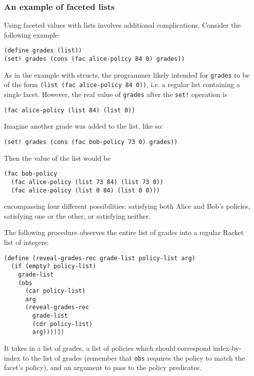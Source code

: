 \documentclass{article}
\begin{document}
\subsubsection{An example of faceted lists}
Using faceted values with lists involves additional complications. Consider the following example:

\begin{lstlisting}
(define grades (list))
(set! grades (cons (fac alice-policy 84 0) grades))
\end{lstlisting}

As in the example with structs, the programmer likely intended for \texttt{grades} to be of the form \texttt{(list (fac alice-policy 84 0))}, i.e. a regular list containing a single facet. However, the real value of \texttt{grades} after the \texttt{set!} operation is

\begin{lstlisting}
(fac alice-policy (list 84) (list 0))
\end{lstlisting}

Imagine another grade was added to the list, like so:

\begin{lstlisting}
(set! grades (cons (fac bob-policy 73 0) grades))
\end{lstlisting}

Then the value of the list would be

\begin{lstlisting}
(fac bob-policy
  (fac alice-policy (list 73 84) (list 73 0))
  (fac alice-policy (list 0 84) (list 0 0)))
\end{lstlisting}

encompassing four different possibilities: satisfying both Alice and Bob's policies, satisfying one or the other, or satisfying neither.

The following procedure observes the entire list of grades into a regular Racket list of integers:

\begin{lstlisting}
(define (reveal-grades-rec grade-list policy-list arg)
  (if (empty? policy-list)
    grade-list
    (obs
      (car policy-list)
      arg
      (reveal-grades-rec
        grade-list
        (cdr policy-list)
        arg))))])
\end{lstlisting}

It takes in a list of grades, a list of policies which should correspond index-by-index to the list of grades (remember that \texttt{obs} requires the policy to match the facet's policy), and an argument to pass to the policy predicates.
\end{document}
